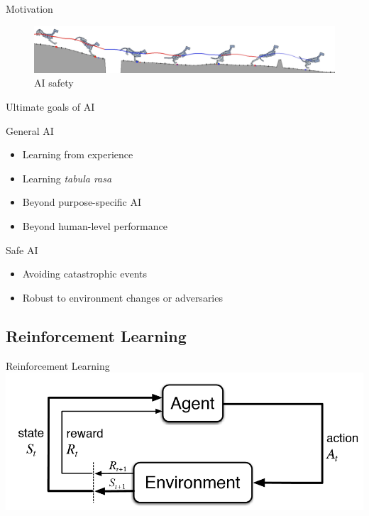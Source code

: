 \documentclass{beamer}
\begin{document}
\begin{frame}{Motivation}
\begin{figure}
\includegraphics[width=\linewidth]{gfx/running_tiger.png}
\caption{AI safety}
\end{figure}
\end{frame}


\begin{frame}{Ultimate goals of AI}

\begin{block}{General AI}
\begin{itemize}
\item Learning from experience
\item Learning \textit{tabula rasa}
\item Beyond purpose-specific AI
\item Beyond human-level performance
\end{itemize}
\end{block}

\begin{block}{Safe AI}
\begin{itemize}
\item Avoiding catastrophic events
\item Robust to environment changes or adversaries
\end{itemize}
\end{block}

\end{frame}




\subsection{Reinforcement Learning}

\begin{frame}{Reinforcement Learning}
\includegraphics[width=\linewidth]{../gfx/rl_cycle.png}
\end{frame}
\end{document}
